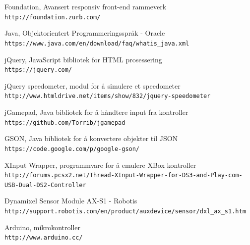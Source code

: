 \documentclass[12pt]{report}
\begin{document}
\begin{thebibliography}{3}
	Foundation, Avansert responsiv front-end rammeverk
	\\\texttt{http://foundation.zurb.com/}

	Java, Objektorientert Programmeringsspråk - Oracle
	\\\texttt{https://www.java.com/en/download/faq/whatis\_java.xml}
	
	jQuery, JavaScript bibliotek for HTML prosessering
	\\\texttt{https://jquery.com/}

	jQuery speedometer, modul for å simulere et speedometer
	\\\texttt{http://www.htmldrive.net/items/show/832/jquery-speedometer}

	jGamepad, Java bibliotek for å håndtere input fra kontroller
	\\\texttt{https://github.com/Torrib/jgamepad}

	GSON, Java bibliotek for å konvertere objekter til JSON
	\\\texttt{https://code.google.com/p/google-gson/}

	XInput Wrapper, programmvare for å emulere XBox kontroller
	\\\texttt{http://forums.pcsx2.net/Thread-XInput-Wrapper-for-DS3-and-Play-com-USB-Dual-DS2-Controller}
	
	Dynamixel Sensor Module AX-S1 - Robotis
	\\\texttt{http://support.robotis.com/en/product/auxdevice/sensor/dxl\_ax\_s1.htm}

	Arduino, mikrokontroller
	\\\texttt{http://www.arduino.cc/}

\end{thebibliography}

\clearpage

\medskip
\end{document}
